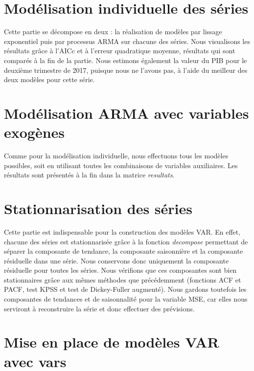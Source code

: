 \documentclass[12pt,]{article}
\begin{document}
\section{Modélisation individuelle des
séries}\label{modelisation-individuelle-des-series}

Cette partie se décompose en deux : la réalisation de modèles par
lissage exponentiel puis par processus ARMA sur chacune des séries. Nous
visualisons les résultats grâce à l'AICc et à l'erreur quadratique
moyenne, résultats qui sont comparés à la fin de la partie. Nous
estimons également la valeur du PIB pour le deuxième trimestre de 2017,
puisque nous ne l'avons pas, à l'aide du meilleur des deux modèles pour
cette série.

\section{Modélisation ARMA avec variables
exogènes}\label{modelisation-arma-avec-variables-exogenes}

Comme pour la modélisation individuelle, nous effectuons tous les
modèles possibles, soit en utilisant toutes les combinaisons de
variables auxiliaires. Les résultats sont présentés à la fin dans la
matrice \emph{resultats}.

\section{Stationnarisation des
séries}\label{stationnarisation-des-series}

Cette partie est indispensable pour la construction des modèles VAR. En
effet, chacune des séries est stationnarisée grâce à la fonction
\emph{decompose} permettant de séparer la composante de tendance, la
composante saisonnière et la composante résiduelle dans une série. Nous
conservons donc uniquement la composante résiduelle pour toutes les
séries. Nous vérifions que ces composantes sont bien stationnaires grâce
aux mêmes méthodes que précédemment (fonctions ACF et PACF, test KPSS et
test de Dickey-Fuller augmenté). Nous gardons toutefois les composantes
de tendances et de saisonnalité pour la variable MSE, car elles nous
serviront à reconstruire la série et donc effectuer des prévisions.

\section{Mise en place de modèles VAR avec
vars}\label{mise-en-place-de-modeles-var-avec-vars}
\end{document}
